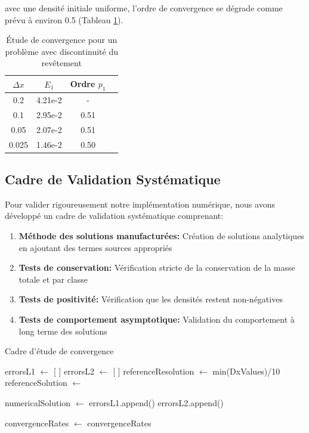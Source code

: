 avec une densité initiale uniforme, l'ordre de convergence se dégrade comme prévu à environ 0.5 (Tableau \ref{tab:conv_revetement}).

\begin{table}[htbp]
\centering
\caption{Étude de convergence pour un problème avec discontinuité du revêtement}
\label{tab:conv_revetement}
\begin{tabular}{cccc}
\toprule
$\Delta x$ & $E_1$ & Ordre $p_1$ \\
\midrule
0.2 & 4.21e-2 & - \\
0.1 & 2.95e-2 & 0.51 \\
0.05 & 2.07e-2 & 0.51 \\
0.025 & 1.46e-2 & 0.50 \\
\bottomrule
\end{tabular}
\end{table}

\subsection{Cadre de Validation Systématique}
\label{subsec:cadre_validation}

Pour valider rigoureusement notre implémentation numérique, nous avons développé un cadre de validation systématique comprenant:

\begin{enumerate}
    \item \textbf{Méthode des solutions manufacturées:} Création de solutions analytiques en ajoutant des termes sources appropriés
    \item \textbf{Tests de conservation:} Vérification stricte de la conservation de la masse totale et par classe
    \item \textbf{Tests de positivité:} Vérification que les densités restent non-négatives
    \item \textbf{Tests de comportement asymptotique:} Validation du comportement à long terme des solutions
\end{enumerate}

\begin{algorithm}[htbp]
\caption{Cadre d'étude de convergence}
\begin{algorithmic}[1]
    \State errorsL1 $\gets$ [ ]
    \State errorsL2 $\gets$ [ ]
    \State referenceResolution $\gets$ min(DxValues)/10
    \State referenceSolution $\gets$ 
    
        \State numericalSolution $\gets$ 
        \State errorsL1.append()
        \State errorsL2.append()
    \EndFor
    
    \State convergenceRates $\gets$ 
    \State \Return convergenceRates
\EndFunction
\end{algorithmic}
\label{alg:convergence_study}
\end{algorithm}

